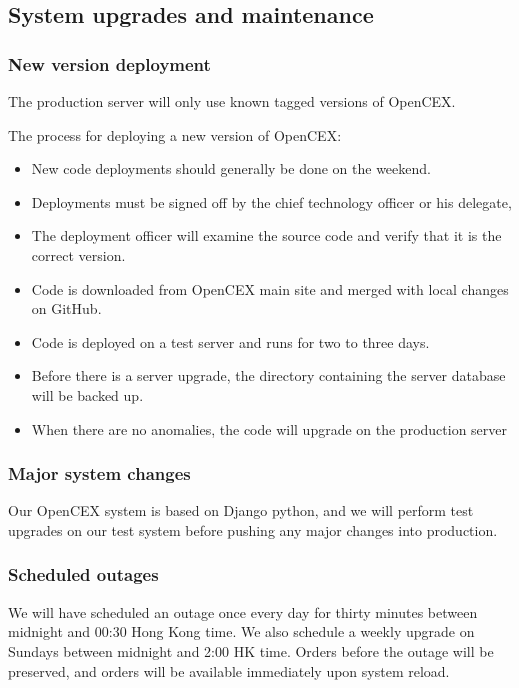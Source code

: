 \subsection{System upgrades and maintenance}
\subsubsection{New version deployment}
The production server will only use known tagged versions of OpenCEX.

The process for deploying a new version of OpenCEX:
\begin{itemize}
  \item New code deployments should generally be done on the weekend.
  \item Deployments must be signed off by the chief technology officer
    or his delegate,
  \item The deployment officer will examine the source code and verify
    that it is the correct version.
  \item Code is downloaded from OpenCEX main site and merged with
    local changes on GitHub.
  \item Code is deployed on a test server and runs for two to three days.
  \item Before there is a server upgrade, the directory containing the
    server database will be backed up.
  \item When there are no anomalies, the code will upgrade on the
    production server
\end{itemize}

\subsubsection{Major system changes}

Our OpenCEX system is based on Django python, and we will perform test
upgrades on our test system before pushing any major changes into
production.

\subsubsection{Scheduled outages}
We will have scheduled an outage once every day for thirty minutes
between midnight and 00:30 Hong Kong time.  We also schedule a weekly
upgrade on Sundays between midnight and 2:00 HK time.  Orders before
the outage will be preserved, and orders will be available immediately
upon system reload.

